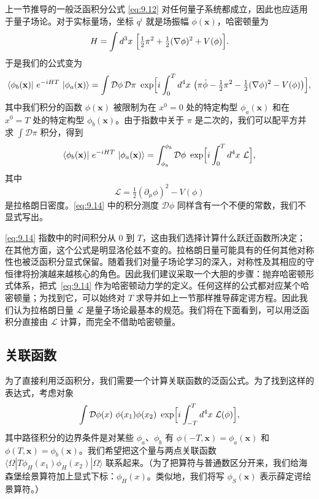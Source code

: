 上一节推导的一般泛函积分公式 \eqref{eq:9.12} 对任何量子系统都成立，因此也应适用于量子场论。对于实标量场，坐标 $q^i$ 就是场振幅 $\phi(\mathbf{x})$，哈密顿量为
\begin{equation}
  H = \int d^3x\ \Bigl[ \tfrac{1}{2}\pi^2 + \tfrac{1}{2}(\nabla\phi)^2
    + V(\phi) \Bigr].
\end{equation}
于是我们的公式变为
\begin{equation}
  \langle \phi_b(\mathbf{x})|\ e^{-iHT}\ |\phi_a(\mathbf{x})\rangle
  = \int \mathcal{D}\phi\,\mathcal{D}\pi\ \exp\Bigl[ i\int_0^T d^4x\
    \bigl( \pi\dot{\phi} - \tfrac{1}{2}\pi^2 - \tfrac{1}{2}(\nabla\phi)^2
      - V(\phi) \bigr) \Bigr] ,
\end{equation}
其中我们积分的函数 $\phi(\mathbf{x})$ 被限制为在 $x^0 = 0$ 处的特定构型 $\phi_a(\mathbf{x})$ 和在 $x^0 = T$ 处的特定构型 $\phi_b(\mathbf{x})$。由于指数中关于 $\pi$ 是二次的，我们可以配平方并求 $\int\mathcal{D}\pi$ 积分，得到
\begin{equation}
  \langle \phi_b(\mathbf{x})|\ e^{-iHT}\ |\phi_a(\mathbf{x})\rangle
  = \int_{\phi_a}^{\phi_b} \mathcal{D}\phi\ \exp\Bigl[ i\int_0^T d^4x\
    \mathcal{L} \Bigr],
  \label{eq:9.14}
\end{equation}
其中
\begin{equation}
  \mathcal{L} = \tfrac{1}{2}(\partial_\mu\phi)^2 - V(\phi)
\end{equation}
是拉格朗日密度。\eqref{eq:9.14} 中的积分测度 $\mathcal{D}\phi$ 同样含有一个不便的常数，我们不显式写出。

\eqref{eq:9.14} 指数中的时间积分从 0 到 $T$，这由我们选择计算什么跃迁函数所决定；在其他方面，这个公式是明显洛伦兹不变的。拉格朗日量可能具有的任何其他对称性也被泛函积分显式保留。随着我们对量子场论学习的深入，对称性及其相应的守恒律将扮演越来越核心的角色。因此我们建议采取一个大胆的步骤：抛弃哈密顿形式体系，把式~\eqref{eq:9.14} 作为哈密顿动力学的定义。任何这样的公式都对应某个哈密顿量；为找到它，可以始终对 $T$ 求导并如上一节那样推导薛定谔方程。因此我们认为拉格朗日量 $\mathcal{L}$ 是量子场论最基本的规范。我们将在下面看到，可以用泛函积分直接由 $\mathcal{L}$ 计算，而完全不借助哈密顿量。

\subsection{关联函数}

为了直接利用泛函积分，我们需要一个计算关联函数的泛函公式。为了找到这样的表达式，考虑对象
\begin{equation}
  \int \mathcal{D}\phi(x)\ \phi(x_1)\phi(x_2)\ \exp\Bigl[ i\int_{-T}^{T}
    d^4x\ \mathcal{L}(\phi) \Bigr],
  \label{eq:9.15}
\end{equation}
其中路径积分的边界条件是对某些 $\phi_a$、$\phi_b$ 有 $\phi(-T,\mathbf{x}) = \phi_a(\mathbf{x})$ 和 $\phi(T,\mathbf{x}) = \phi_b(\mathbf{x})$。我们希望把这个量与两点关联函数 $\langle\Omega|T\phi_H(x_1)\phi_H(x_2)|\Omega\rangle$ 联系起来。（为了把算符与普通数区分开来，我们给海森堡绘景算符加上显式下标：$\phi_H(x)$。类似地，我们将写 $\phi_S(\mathbf{x})$ 表示薛定谔绘景算符。）

